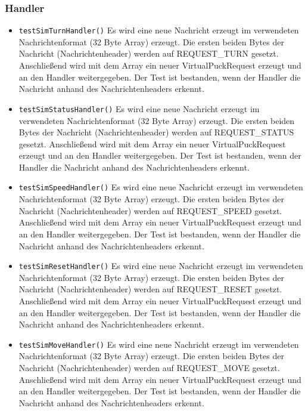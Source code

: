 \documentclass[10pt,a4paper]{article}
\begin{document}
			\subsubsection{Handler}
			\begin{itemize}
				\item \texttt{testSimTurnHandler()} Es wird eine neue Nachricht erzeugt im verwendeten Nachrichtenformat (32 Byte Array) erzeugt.
				Die ersten beiden Bytes der Nachricht (Nachrichtenheader) werden auf REQUEST\_TURN gesetzt. Anschließend wird mit dem Array ein neuer
				VirtualPuckRequest erzeugt und an den Handler weitergegeben.
				Der Test ist bestanden, wenn der Handler die Nachricht anhand des Nachrichtenheaders erkennt.
				\item \texttt{testSimStatusHandler()} Es wird eine neue Nachricht erzeugt im verwendeten Nachrichtenformat (32 Byte Array) erzeugt.
				Die ersten beiden Bytes der Nachricht (Nachrichtenheader) werden auf REQUEST\_STATUS gesetzt. Anschließend wird mit dem Array ein
				neuer VirtualPuckRequest erzeugt und an den Handler weitergegeben.
				Der Test ist bestanden, wenn der Handler die Nachricht anhand des Nachrichtenheaders erkennt.
				\item \texttt{testSimSpeedHandler()} Es wird eine neue Nachricht erzeugt im verwendeten Nachrichtenformat (32 Byte Array) erzeugt.
				Die ersten beiden Bytes der Nachricht (Nachrichtenheader) werden auf REQUEST\_SPEED gesetzt. Anschließend wird mit dem Array ein
				neuer VirtualPuckRequest erzeugt und an den Handler weitergegeben.
				Der Test ist bestanden, wenn der Handler die Nachricht anhand des Nachrichtenheaders erkennt.
				\item \texttt{testSimResetHandler()} Es wird eine neue Nachricht erzeugt im verwendeten Nachrichtenformat (32 Byte Array) erzeugt.
				Die ersten beiden Bytes der Nachricht (Nachrichtenheader) werden auf REQUEST\_RESET gesetzt. Anschließend wird mit dem Array ein neuer
				VirtualPuckRequest erzeugt und an den Handler weitergegeben.
				Der Test ist bestanden, wenn der Handler die Nachricht anhand des Nachrichtenheaders erkennt.
				\item \texttt{testSimMoveHandler()} Es wird eine neue Nachricht erzeugt im verwendeten Nachrichtenformat (32 Byte Array) erzeugt.
				Die ersten beiden Bytes der Nachricht (Nachrichtenheader) werden auf REQUEST\_MOVE gesetzt. Anschließend wird mit dem Array ein neuer
				VirtualPuckRequest erzeugt und an den Handler weitergegeben.
				Der Test ist bestanden, wenn der Handler die Nachricht anhand des Nachrichtenheaders erkennt.

\end{itemize}
\end{document}
